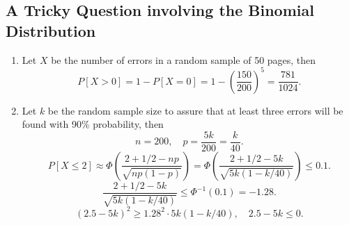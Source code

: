 \documentclass[11pt,a4paper]{article}
\begin{document}
\subsection{A Tricky Question involving the Binomial Distribution}

\begin{enumerate}[label=\roman*)]
\item
Let $X$ be the number of errors in a random sample of 50 pages, then
$$P[X>0]=1-P[X=0]=1-\left(\frac{150}{200}\right)^5=\frac{781}{1024}.$$
\item
Let $k$ be the random sample size to assure that at least three errors will be found with 90\% probability, then
$$n=200,\quad p=\frac{5k}{200}=\frac{k}{40}.$$
$$P[X\leqslant 2]\approx\Phi\left(\frac{2+1/2-np}{\sqrt{np(1-p)}}\right)=\Phi\left(\frac{2+1/2-5k}{\sqrt{5k(1-k/40)}}\right)\leqslant0.1.$$
$$\frac{2+1/2-5k}{\sqrt{5k(1-k/40)}}\leqslant\Phi^{-1}(0.1)=-1.28.$$
$$(2.5-5k)^2\geqslant1.28^2\cdot5k(1-k/40),\quad 2.5-5k\leqslant 0.$$

\end{enumerate}
\end{document}
